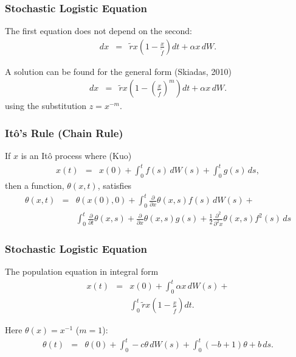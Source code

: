 \documentclass{beamer}   %
\newcommand{\lp}{\left(}
\newcommand{\rp}{\right)}
\newcommand{\half}{\frac{1}{2}}
\newcommand{\pderiv}[1]{\frac{\partial}{\partial {#1}}}
\newcommand{\mderiv}[2]{\frac{\partial^{#1}}{\partial^{#1} {#2}}}
\begin{document}
\begin{frame}
  \frametitle{Stochastic Logistic Equation}

  The first equation does not depend on the second:
  \begin{eqnarray*}
    dx &=& \tilde{r} x \lp 1- \frac{x}{\tilde{f}}\rp dt +\alpha x \, dW.
  \end{eqnarray*}

  \vfill

  A solution can be found for the general form (Skiadas, 2010)
  \begin{eqnarray*}
    dx &=& \tilde{r} x \lp 1- \lp\frac{x}{\tilde{f}}\rp^m\rp dt +\alpha x \, dW.
  \end{eqnarray*}
  using the substitution $z=x^{-m}$.

  
\end{frame}

\begin{frame}
  \frametitle{It\^o's Rule (Chain Rule)}

  If $x$ is an It\^o process where (Kuo)
  \begin{eqnarray*}
    x(t) & = & x(0) + \int^t_0 f(s) \, dW(s) + \int^t_0 g(s) \, ds,
  \end{eqnarray*}
  then a function, $\theta(x,t)$, satisfies
  \begin{eqnarray*}
    \theta(x,t) & = & \theta(x(0),0) + 
    \int^t_0 \pderiv{x} \theta(x,s) f(s) \, dW(s) + \\
    & & \int^t_0 \pderiv{t} \theta(x,s) + \pderiv{x} \theta(x,s) g(s) + \half \mderiv{2}{x} \theta(x,s) f^2(s) \, ds
  \end{eqnarray*}

  
\end{frame}

\begin{frame}
  \frametitle{Stochastic Logistic Equation}

  The population equation in integral form
  \begin{eqnarray*}
    x(t) &=& x(0) + \int_0^t \alpha x \, dW(s) + \\
    & & \int_0^t \tilde{r} x \lp 1- \frac{x}{\tilde{f}}\rp dt .
  \end{eqnarray*}

  \vfill

  Here $\theta(x)=x^{-1}$ ($m=1$):
  \begin{eqnarray*}
    \theta(t) &=& \theta(0) + \int^t_0 -c\theta \, dW(s) +
    \int^t_0 \lp -b+1 \rp \theta + b \, ds.
  \end{eqnarray*}


  
\end{frame}
\end{document}
